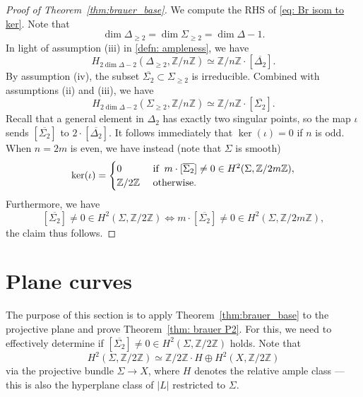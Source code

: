 \documentclass[11pt]{amsart}
\theoremstyle{plain}
\theoremstyle{definition}
\theoremstyle{remark}
\begin{document}
\begin{proof}[Proof of Theorem~\ref{thm:brauer_base}]
    We compute the RHS of \eqref{eq: Br isom to ker}. Note that
    \[
    \dim \Delta_{\geq 2} = \dim \Sigma_{\geq 2} = \dim \Delta -1.
    \]
    In light of assumption (iii) in \ref{defn: ampleness}, we have
    \[
    H_{2\dim \Delta -2}(\Delta_{\geq 2}, \mathbb Z/n \mathbb Z) \simeq \mathbb Z/ n\mathbb Z \cdot [\overline{\Delta_{2}}].
    \]
    By assumption (iv), the subset $\overline{\Sigma_{2}} \subset \Sigma_{\geq 2}$ is irreducible. Combined with assumptions (ii) and (iii), we have
    \[
    H_{2\dim \Delta -2}(\Sigma_{\geq 2}, \mathbb Z/n \mathbb Z) \simeq \mathbb Z/ n\mathbb Z \cdot [\overline{\Sigma_{2}}].
    \]
    Recall that a general element in $\Delta_2$ has exactly two singular points, so the map $\iota$ sends $[\overline{\Sigma_{2}}]$ to $2\cdot [\overline{\Delta_{2}}]$. It follows immediately that $\ker(\iota) = 0$ if $n$ is odd. When $n=2m$ is even, we have instead (note that $\Sigma$ is smooth)
    \[\ker(\iota) = \begin{cases}0 & \text{  if \:} m\cdot [\overline{\Sigma_{2}}] \neq 0 \in H^2(\Sigma, \mathbb Z / 2m \mathbb Z),\\ \mathbb Z / 2\mathbb Z & \text{  otherwise}.\end{cases}\]
    Furthermore, we have 
    \[
    [\overline{\Sigma_{2}}] \neq 0 \in H^2(\Sigma, \mathbb Z / 2 \mathbb Z) \Longleftrightarrow m\cdot [\overline{\Sigma_{2}}] \neq 0 \in H^2(\Sigma, \mathbb Z / 2m \mathbb Z),
    \]
    the claim thus follows.
    \end{proof}
    
    



\section{Plane curves}\label{sec: P2}

The purpose of this section is to apply Theorem~\ref{thm:brauer_base} to the projective plane and prove Theorem~\ref{thm: brauer P2}. For this, we need to effectively determine if $[\overline{\Sigma_{2}}] \neq 0 \in H^2(\Sigma, \mathbb Z/ 2\mathbb Z)$ holds. Note that
\[
H^2(\Sigma, \mathbb Z/ 2\mathbb Z) \simeq \mathbb Z/ 2\mathbb Z \cdot H \oplus H^2(X, \mathbb Z/2\mathbb Z)
\]
via the projective bundle $\Sigma \to X$, where $H$ denotes the relative ample class ---  this is also the hyperplane class of $|L|$ restricted to $\Sigma$.

\smallskip
\end{document}
